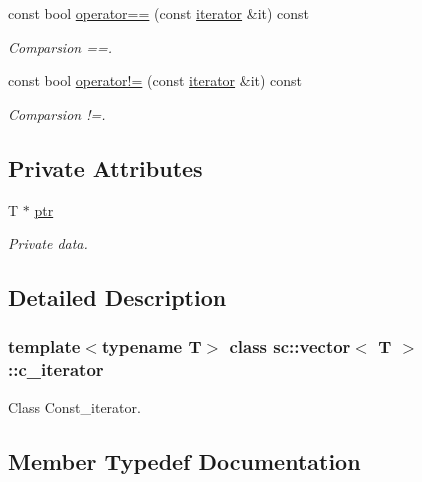 \begin{DoxyCompactItemize}
const bool \hyperlink{classsc_1_1vector_1_1c__iterator_aba78ee811bac2184736548d98358a50e}{operator==} (const \hyperlink{classsc_1_1vector_1_1iterator}{iterator} \&it) const
\begin{DoxyCompactList}\small\item\em Comparsion ==. \end{DoxyCompactList}\item 
const bool \hyperlink{classsc_1_1vector_1_1c__iterator_ad8af1e7fd724bb4b61c78d672ed11003}{operator!=} (const \hyperlink{classsc_1_1vector_1_1iterator}{iterator} \&it) const
\begin{DoxyCompactList}\small\item\em Comparsion !=. \end{DoxyCompactList}\end{DoxyCompactItemize}
\subsection*{Private Attributes}
\begin{DoxyCompactItemize}
\item 
T $\ast$ \hyperlink{classsc_1_1vector_1_1c__iterator_a3bd93bfa6be8fbe010131942c660fe86}{ptr}
\begin{DoxyCompactList}\small\item\em Private data. \end{DoxyCompactList}\end{DoxyCompactItemize}


\subsection{Detailed Description}
\subsubsection*{template$<$typename T$>$\newline
class sc\+::vector$<$ T $>$\+::c\+\_\+iterator}

Class Const\+\_\+iterator. 

\subsection{Member Typedef Documentation}
\mbox{\label{classsc_1_1vector_1_1c__iterator_ad00b7c971e9e1ee7b9f3954d8df9b0d6}} 

